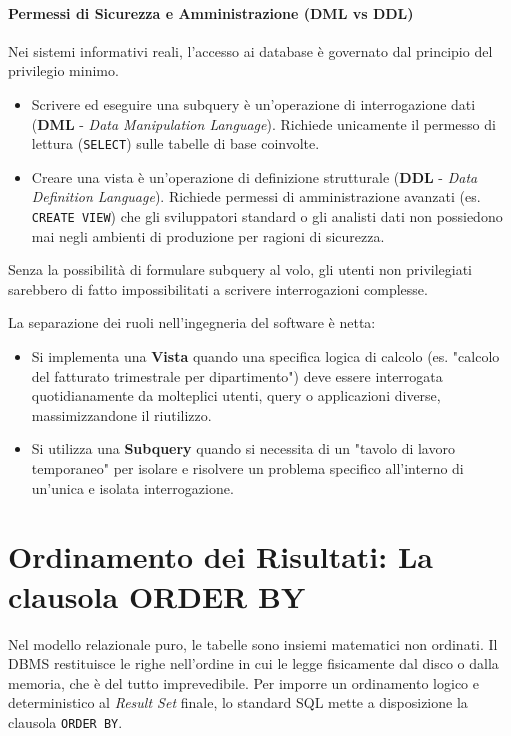 \paragraph{Permessi di Sicurezza e Amministrazione (DML vs DDL)}
Nei sistemi informativi reali, l'accesso ai database è governato dal principio del privilegio minimo.
\begin{itemize}
    \item Scrivere ed eseguire una subquery è un'operazione di interrogazione dati (\textbf{DML} - \textit{Data Manipulation Language}). Richiede unicamente il permesso di lettura (\texttt{SELECT}) sulle tabelle di base coinvolte.
    \item Creare una vista è un'operazione di definizione strutturale (\textbf{DDL} - \textit{Data Definition Language}). Richiede permessi di amministrazione avanzati (es. \texttt{CREATE VIEW}) che gli sviluppatori standard o gli analisti dati non possiedono mai negli ambienti di produzione per ragioni di sicurezza.
\end{itemize}
Senza la possibilità di formulare subquery al volo, gli utenti non privilegiati sarebbero di fatto impossibilitati a scrivere interrogazioni complesse.

\begin{bestpractice}
La separazione dei ruoli nell'ingegneria del software è netta:
\begin{itemize}
    \item Si implementa una \textbf{Vista} quando una specifica logica di calcolo (es. "calcolo del fatturato trimestrale per dipartimento") deve essere interrogata quotidianamente da molteplici utenti, query o applicazioni diverse, massimizzandone il riutilizzo.
    \item Si utilizza una \textbf{Subquery} quando si necessita di un "tavolo di lavoro temporaneo" per isolare e risolvere un problema specifico all'interno di un'unica e isolata interrogazione.
\end{itemize}
\end{bestpractice}

\section{Ordinamento dei Risultati: La clausola ORDER BY}

Nel modello relazionale puro, le tabelle sono insiemi matematici non ordinati. Il DBMS restituisce le righe nell'ordine in cui le legge fisicamente dal disco o dalla memoria, che è del tutto imprevedibile. Per imporre un ordinamento logico e deterministico al \textit{Result Set} finale, lo standard SQL mette a disposizione la clausola \texttt{ORDER BY}.

